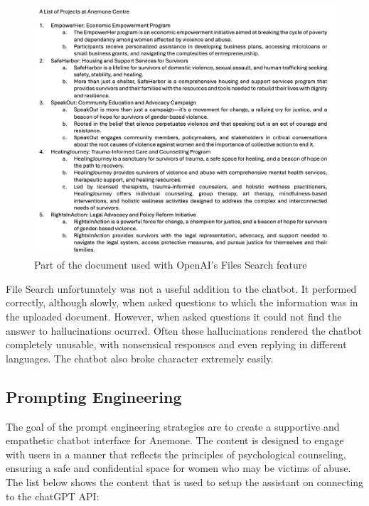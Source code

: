 \begin{figure}[h]
	\centering
	\includegraphics[width=\linewidth]{Resources/chatbotfilesearch.png}
	\caption{Part of the document used with OpenAI's Files Search feature}
	\label{fig:example}
\end{figure}

File Search unfortunately was not a useful addition to the chatbot. It performed correctly, although slowly, when asked questions to which the information was in the uploaded document.
However, when asked questions it could not find the answer to hallucinations ocurred. Often these hallucinations rendered the chatbot completely unusable, with nonsensical responses and even replying in different languages. The chatbot also broke character extremely easily.


\subsection{Prompting Engineering}
The goal of the prompt engineering strategies are to create a supportive and empathetic chatbot interface for Anemone.
The content is designed to engage with users in a manner that reflects the principles of psychological counseling, ensuring a safe and confidential space for women who may be victims of abuse.
The list below shows the content that is used to setup the assistant on connecting to the chatGPT API:

